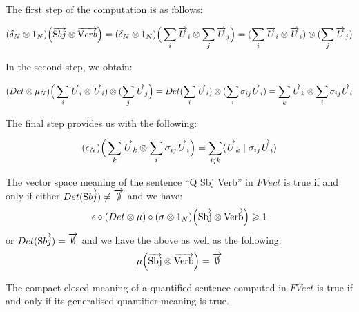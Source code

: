The first step of the computation  is as follows:


\begin{align*}
(\delta_N \otimes 1_{N})\Big(\overrightarrow{\text Sbj} \otimes \overrightarrow{\text Verb}\Big) =   (\delta_N \otimes 1_{N})\Big(\sum_i \overrightarrow{U}_i  \otimes \sum_j \overrightarrow{U}_j \Big ) = (\sum_i \overrightarrow{U}_i \otimes \overrightarrow{U}_i) \otimes (\sum_j \overrightarrow{U}_j)
\end{align*}

\noindent
In the second step, we obtain:

\begin{align*}
(Det \otimes  \mu_N)\Big(\sum_i \overrightarrow{U}_i \otimes \overrightarrow{U}_i) \otimes (\sum_j \overrightarrow{U}_j\Big) =  Det(\sum_i \overrightarrow{U}_i) \otimes  (\sum_i \sigma_{ij} \overrightarrow{U}_i)   = \sum_k \overrightarrow{U}_k \otimes \sum_i \sigma_{ij} \overrightarrow{U}_i
\end{align*}

\noindent
The final step  provides us with the following:

\begin{align*}
(\epsilon_{N})  \Big(\sum_k \overrightarrow{U}_k \otimes \sum_i \sigma_{ij} \overrightarrow{U}_i  \Big) =  \sum_{ijk}  \langle  \overrightarrow{U}_k   \mid  \sigma_{ij} \overrightarrow{U}_i \rangle  
\end{align*}

\begin{definition}
\label{deftrue}
The vector space meaning of the sentence ``Q Sbj Verb'' in $FVect$  is true if and only if either $Det(\overrightarrow{\text Sbj}) \neq \overrightarrow{\emptyset}$ and we have: 
\[
\epsilon \circ (Det \otimes \mu) \circ (\sigma \otimes 1_N) \Big(\overrightarrow{\text{Sbj}} \otimes \overrightarrow{\text{Verb}} \Big) \geqslant {1} 
\] 
or  $Det(\overrightarrow{\text Sbj}) =  \overrightarrow{\emptyset}$ and we have the above as well as the following:
\[
\mu \Big(\overrightarrow{\text{Sbj}} \otimes \overrightarrow{\text{Verb}} \Big) = \overrightarrow{\emptyset}\]
\end{definition}

\begin{proposition}
The  compact closed meaning of a quantified sentence computed in $FVect$  is true if and only if  its generalised quantifier meaning is true.
\end{proposition}

